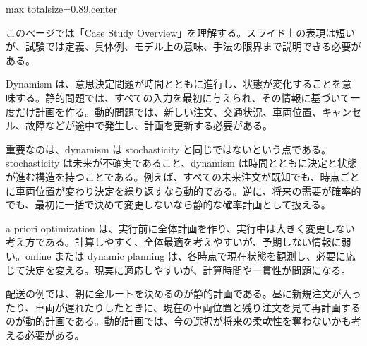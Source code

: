 \begin{minipage}[t]{0.58\textwidth}
\begin{adjustbox}{max totalsize={\textwidth}{0.89\textheight},center}
\begin{minipage}{\textwidth}\scriptsize
{}このページでは「Case Study Overview」を理解する。スライド上の表現は短いが、試験では定義、具体例、モデル上の意味、手法の限界まで説明できる必要がある。\par
Dynamism は、意思決定問題が時間とともに進行し、状態が変化することを意味する。静的問題では、すべての入力を最初に与えられ、その情報に基づいて一度だけ計画を作る。動的問題では、新しい注文、交通状況、車両位置、キャンセル、故障などが途中で発生し、計画を更新する必要がある。\par
重要なのは、dynamism は stochasticity と同じではないという点である。stochasticity は未来が不確実であること、dynamism は時間とともに決定と状態が進む構造を持つことである。例えば、すべての未来注文が既知でも、時点ごとに車両位置が変わり決定を繰り返すなら動的である。逆に、将来の需要が確率的でも、最初に一括で決めて変更しないなら静的な確率計画として扱える。\par
a priori optimization は、実行前に全体計画を作り、実行中は大きく変更しない考え方である。計算しやすく、全体最適を考えやすいが、予期しない情報に弱い。online または dynamic planning は、各時点で現在状態を観測し、必要に応じて決定を変える。現実に適応しやすいが、計算時間や一貫性が問題になる。\par
配送の例では、朝に全ルートを決めるのが静的計画である。昼に新規注文が入ったり、車両が遅れたりしたときに、現在の車両位置と残り注文を見て再計画するのが動的計画である。動的計画では、今の選択が将来の柔軟性を奪わないかも考える必要がある。\par

\end{minipage}
\end{adjustbox}
\end{minipage}
